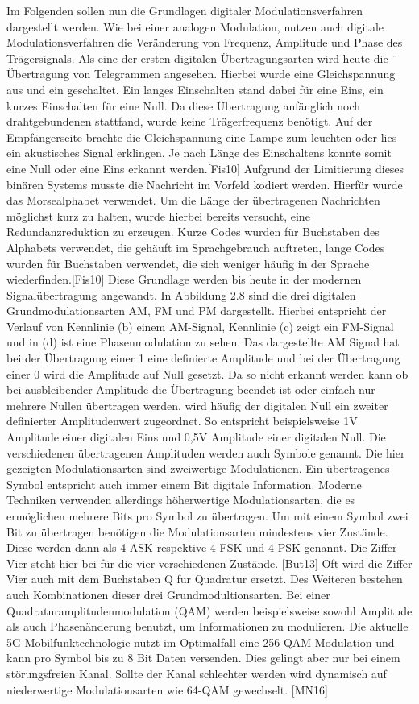 Im Folgenden sollen nun die Grundlagen digitaler Modulationsverfahren dargestellt werden. Wie bei einer analogen Modulation, nutzen auch digitale Modulationsverfahren die Veränderung von Frequenz, Amplitude und Phase des Trägersignals. Als eine der ersten digitalen Übertragungsarten wird heute die ¨ Übertragung von Telegrammen angesehen. Hierbei wurde eine Gleichspannung aus und ein geschaltet. Ein langes Einschalten stand dabei für eine Eins, ein kurzes Einschalten für eine Null. Da diese Übertragung anfänglich noch drahtgebundenen stattfand, wurde keine Trägerfrequenz benötigt. Auf der Empfängerseite brachte die Gleichspannung eine Lampe zum leuchten oder lies ein akustisches Signal
erklingen. Je nach Länge des Einschaltens konnte somit eine Null oder eine Eins erkannt
werden.[Fis10] Aufgrund der Limitierung dieses binären Systems musste die Nachricht im
Vorfeld kodiert werden. Hierfür wurde das Morsealphabet verwendet. Um die Länge der
übertragenen Nachrichten möglichst kurz zu halten, wurde hierbei bereits versucht, eine
Redundanzreduktion zu erzeugen. Kurze Codes wurden für Buchstaben des Alphabets verwendet, die gehäuft im Sprachgebrauch auftreten, lange Codes wurden für Buchstaben verwendet, die sich weniger häufig in der Sprache wiederfinden.[Fis10] Diese Grundlage werden bis heute in der modernen Signalübertragung angewandt. In Abbildung 2.8 sind die drei digitalen Grundmodulationsarten AM, FM und PM dargestellt. Hierbei entspricht der Verlauf von Kennlinie (b) einem AM-Signal, Kennlinie (c)
zeigt ein FM-Signal und in (d) ist eine Phasenmodulation zu sehen. Das dargestellte AM Signal hat bei der Übertragung einer 1 eine definierte Amplitude und bei der Übertragung
einer 0 wird die Amplitude auf Null gesetzt. Da so nicht erkannt werden kann ob bei
ausbleibender Amplitude die Übertragung beendet ist oder einfach nur mehrere Nullen übertragen werden, wird häufig der digitalen Null ein zweiter definierter Amplitudenwert zugeordnet. So entspricht beispielsweise 1V Amplitude einer digitalen Eins und 0,5V Amplitude einer digitalen Null. Die verschiedenen übertragenen Amplituden werden auch Symbole genannt. Die hier gezeigten Modulationsarten sind zweiwertige Modulationen. Ein übertragenes Symbol entspricht auch immer einem Bit digitale Information. Moderne Techniken verwenden allerdings höherwertige Modulationsarten, die es ermöglichen mehrere Bits pro Symbol zu übertragen. Um mit einem Symbol zwei Bit zu übertragen benötigen
die Modulationsarten mindestens vier Zustände. Diese werden dann als 4-ASK respektive 4-FSK und 4-PSK genannt. Die Ziffer Vier steht hier bei für die vier verschiedenen Zustände. [But13] Oft wird die Ziffer Vier auch mit dem Buchstaben Q fur Quadratur ersetzt. Des Weiteren bestehen auch Kombinationen dieser drei Grundmodultionsarten. Bei einer Quadraturamplitudenmodulation (QAM) werden beispielsweise sowohl Amplitude als auch Phasenänderung benutzt, um Informationen zu modulieren. Die aktuelle
5G-Mobilfunktechnologie nutzt im Optimalfall eine 256-QAM-Modulation und kann pro
Symbol bis zu 8 Bit Daten versenden. Dies gelingt aber nur bei einem störungsfreien Kanal.
Sollte der Kanal schlechter werden wird dynamisch auf niederwertige Modulationsarten wie
64-QAM gewechselt. [MN16]

